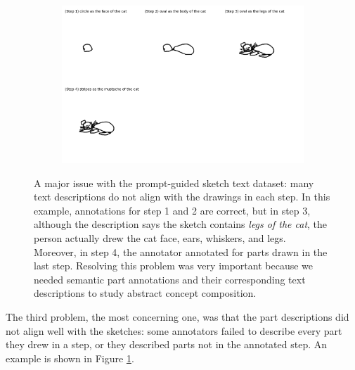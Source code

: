 \begin{figure}[!htb]
\begin{subfigure}{\textwidth}
\centering
\includegraphics[width=\linewidth]{data_collection/v1_misalign_text_drawing.png}  
\end{subfigure}
\caption{A major issue with the prompt-guided sketch text dataset: many text descriptions do not align with the drawings in each step. In this example, annotations for step 1 and 2 are correct, but in step 3, although the description says the sketch contains \textit{legs of the cat}, the person actually drew the cat face, ears, whiskers, and legs. Moreover, in step 4, the annotator annotated for parts drawn in the last step. Resolving this problem was very important because we needed semantic part annotations and their corresponding text descriptions to study abstract concept composition.}
\label{v1.misalign}
\end{figure}

The third problem, the most concerning one, was that the part descriptions did not align well with the sketches: some annotators failed to describe every part they drew in a step, or they described parts not in the annotated step. An example is shown in Figure \ref{v1.misalign}.    



